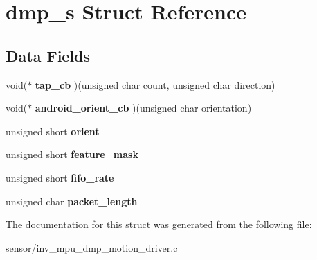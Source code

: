 \hypertarget{structdmp__s}{}\section{dmp\+\_\+s Struct Reference}
\label{structdmp__s}
\subsection*{Data Fields}
\begin{DoxyCompactItemize}
\item 
void($\ast$ {\bfseries tap\+\_\+cb} )(unsigned char count, unsigned char direction)\hypertarget{structdmp__s_ab0b80746a64fa93324f8a492ce4dd6c0}{}\label{structdmp__s_ab0b80746a64fa93324f8a492ce4dd6c0}

\item 
void($\ast$ {\bfseries android\+\_\+orient\+\_\+cb} )(unsigned char orientation)\hypertarget{structdmp__s_a40c5a9114d1419687304b81e07299e05}{}\label{structdmp__s_a40c5a9114d1419687304b81e07299e05}

\item 
unsigned short {\bfseries orient}\hypertarget{structdmp__s_ac949b11ebfe17c3a2ac42785a1437c25}{}\label{structdmp__s_ac949b11ebfe17c3a2ac42785a1437c25}

\item 
unsigned short {\bfseries feature\+\_\+mask}\hypertarget{structdmp__s_ac1c048fa56b613b3223d2e66ac2c050f}{}\label{structdmp__s_ac1c048fa56b613b3223d2e66ac2c050f}

\item 
unsigned short {\bfseries fifo\+\_\+rate}\hypertarget{structdmp__s_a4aec83107ddc0d95ddf30cce1b7e6465}{}\label{structdmp__s_a4aec83107ddc0d95ddf30cce1b7e6465}

\item 
unsigned char {\bfseries packet\+\_\+length}\hypertarget{structdmp__s_a6423143ff761c75d97f34c8465393ea0}{}\label{structdmp__s_a6423143ff761c75d97f34c8465393ea0}

\end{DoxyCompactItemize}


The documentation for this struct was generated from the following file\+:\begin{DoxyCompactItemize}
\item 
sensor/inv\+\_\+mpu\+\_\+dmp\+\_\+motion\+\_\+driver.\+c\end{DoxyCompactItemize}
